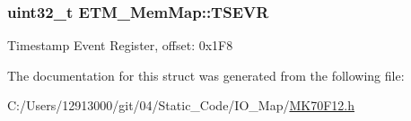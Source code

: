 \subsubsection[{T\+S\+E\+V\+R}]{\setlength{\rightskip}{0pt plus 5cm}uint32\+\_\+t E\+T\+M\+\_\+\+Mem\+Map\+::\+T\+S\+E\+V\+R}\label{struct_e_t_m___mem_map_ad30bdaff018bc7d3b586ce0ca41dfd9b}
Timestamp Event Register, offset\+: 0x1\+F8 

The documentation for this struct was generated from the following file\+:\begin{DoxyCompactItemize}
\item 
C\+:/\+Users/12913000/git/04/\+Static\+\_\+\+Code/\+I\+O\+\_\+\+Map/\hyperlink{_m_k70_f12_8h}{M\+K70\+F12.\+h}\end{DoxyCompactItemize}
